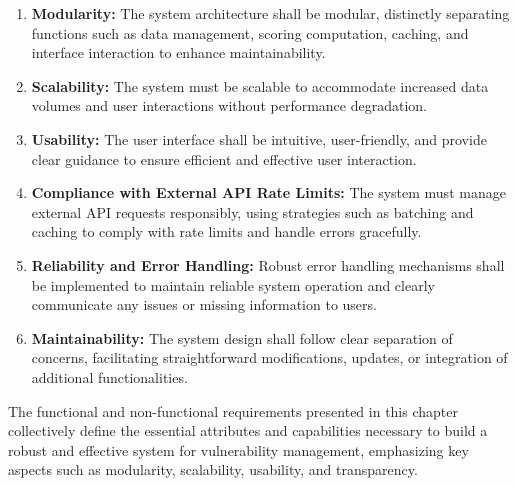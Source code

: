 \begin{enumerate}
	
	\item \label{nfr:modularity}
	      \textbf{Modularity:} The system architecture shall be modular, distinctly separating functions such as data management, scoring computation, caching, and interface interaction to enhance maintainability.
	      
	\item \label{nfr:scalability}
	      \textbf{Scalability:} The system must be scalable to accommodate increased data volumes and user interactions without performance degradation.
	      
	\item \label{nfr:usability}
	      \textbf{Usability:} The user interface shall be intuitive, user-friendly, and provide clear guidance to ensure efficient and effective user interaction.
	      
	\item \label{nfr:rate_limit_compliance}
	      \textbf{Compliance with External API Rate Limits:} The system must manage external API requests responsibly, using strategies such as batching and caching to comply with rate limits and handle errors gracefully.
	      
	\item \label{nfr:reliability_fallbacks}
	      \textbf{Reliability and Error Handling:} Robust error handling mechanisms shall be implemented to maintain reliable system operation and clearly communicate any issues or missing information to users.
	      
	\item \label{nfr:maintainability}
	      \textbf{Maintainability:} The system design shall follow clear separation of concerns, facilitating straightforward modifications, updates, or integration of additional functionalities.
	      
\end{enumerate}

The functional and non-functional requirements presented in this chapter collectively define the essential attributes and capabilities necessary to build a robust and effective system for vulnerability management, emphasizing key aspects such as modularity, scalability, usability, and transparency.


